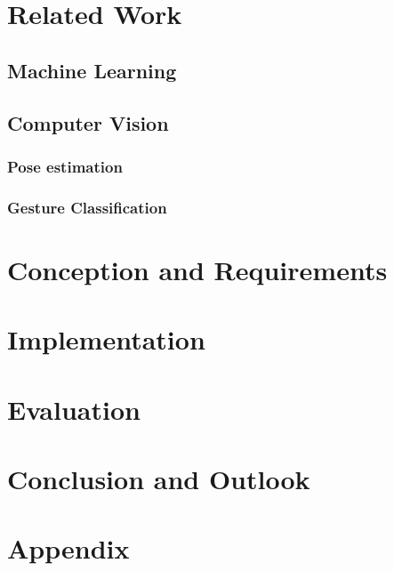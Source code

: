 \documentclass[12pt,a4paper,twoside]{report}
\theoremstyle{definition}
\begin{document}
    \chapter{Related Work}
			\section{Machine Learning}
			\section{Computer Vision}
				\subsection{Pose estimation}
				\subsection{Gesture Classification}
				
	

	\chapter{Conception and Requirements}
	\label{ch:Konzept}  	
		
    \cleardoublepage    
    
    \chapter{Implementation}
    \label{ch:implementierung}   
   		
   		
    \chapter{Evaluation}
	\label{ch:Bewertung}  
		
    \cleardoublepage    

    \chapter{Conclusion and Outlook}

    \chapter{Appendix}
    \cleardoublepage
    
\end{document}
